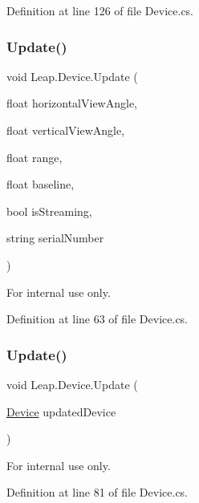 Definition at line 126 of file Device.\+cs.

\mbox{\label{class_leap_1_1_device_a72984bfbe2d07d19cc36733cb5be4228}} 
\subsubsection{\texorpdfstring{Update()}{Update()}\hspace{0.1cm}{\footnotesize\ttfamily [1/2]}}
{\footnotesize\ttfamily void Leap.\+Device.\+Update (\begin{DoxyParamCaption}\item[{float}]{horizontal\+View\+Angle,  }\item[{float}]{vertical\+View\+Angle,  }\item[{float}]{range,  }\item[{float}]{baseline,  }\item[{bool}]{is\+Streaming,  }\item[{string}]{serial\+Number }\end{DoxyParamCaption})}



For internal use only. 



Definition at line 63 of file Device.\+cs.

\mbox{\label{class_leap_1_1_device_a90d415256fe46eedeafb5611171c0d94}} 
\subsubsection{\texorpdfstring{Update()}{Update()}\hspace{0.1cm}{\footnotesize\ttfamily [2/2]}}
{\footnotesize\ttfamily void Leap.\+Device.\+Update (\begin{DoxyParamCaption}\item[{\mbox{\hyperlink{class_leap_1_1_device}{Device}}}]{updated\+Device }\end{DoxyParamCaption})}



For internal use only. 



Definition at line 81 of file Device.\+cs.



